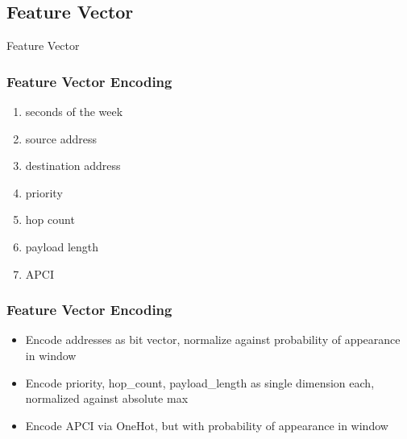 \subsection{Feature Vector}
\begin{frame}[c]
	\centering
	\LARGE Feature Vector
\end{frame}

\begin{frame}[c]
	\frametitle{Feature Vector Encoding}
	
	\begin{enumerate}
		\item seconds of the week
		\item source address
		\item destination address
		\item priority
		\item hop count
		\item payload length
		\item APCI
	\end{enumerate}
\end{frame}

\begin{frame}[c]
	\frametitle{Feature Vector Encoding}
	
	\begin{itemize}
		\item Encode addresses as bit vector, normalize against probability of appearance in window
		\item Encode priority, hop\_count, payload\_length as single dimension each, normalized against absolute max
		\item Encode APCI via OneHot, but with probability of appearance in window
	\end{itemize}
\end{frame}